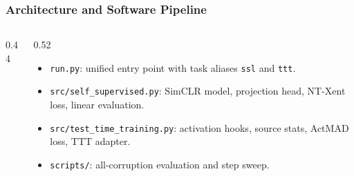 \documentclass[aspectratio=169,8pt]{beamer}
\newcommand{\slidetitle}[1]{\vspace{-0.2cm}\frametitle{#1}}
\begin{document}
\begin{frame}[label=slide9]
\slidetitle{Architecture and Software Pipeline}
\begin{columns}[T,totalwidth=\linewidth]
\begin{column}{0.44\linewidth}
\end{column}
\begin{column}{0.52\linewidth}
\begin{itemize}\setlength\itemsep{0.22cm}
\item \texttt{run.py}: unified entry point with task aliases \texttt{ssl} and \texttt{ttt}.
\item \texttt{src/self\_supervised.py}: SimCLR model, projection head, NT-Xent loss, linear evaluation.
\item \texttt{src/test\_time\_training.py}: activation hooks, source stats, ActMAD loss, TTT adapter.
\item \texttt{scripts/}: all-corruption evaluation and step sweep.
\end{itemize}
\end{column}
\end{columns}
\end{frame}
\end{document}
